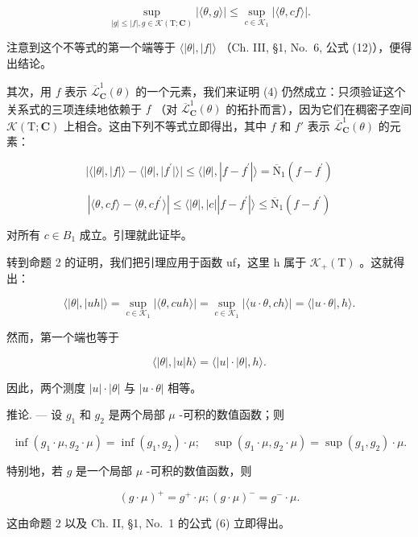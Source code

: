 \[
\sup _ {| g | \leqslant | f |, g \in \mathscr {K} (\mathrm{T}; \mathbf {C})} | \langle \theta , g \rangle | \leqslant \sup _ {c \in \mathscr {K} _ {1}} | \langle \theta , c f \rangle |.
\]

注意到这个不等式的第一个端等于 \(\langle|\theta|,|f|\rangle\) （Ch. III, §1, No.~6, 公式 (12)），便得出结论。

其次，用 \(f\) 表示 \(\overline{\mathcal{L}}_{\mathbf{C}}^{1}(\theta)\) 的一个元素，我们来证明 (4) 仍然成立：只须验证这个关系式的三项连续地依赖于 \(f\) （对 \(\overline{\mathcal{L}}_{\mathbf{C}}^{1}(\theta)\) 的拓扑而言），因为它们在稠密子空间 \(\mathcal{K}(\mathrm{T};\mathbf{C})\) 上相合。这由下列不等式立即得出，其中 \(f\) 和 \(f'\) 表示 \(\overline{\mathcal{L}}_{\mathbf{C}}^{1}(\theta)\) 的元素：

\[
| \langle | \theta |, | f | \rangle - \langle | \theta |, | f ^ {\prime} | \rangle | \leqslant \langle | \theta |, | f - f ^ {\prime} | \rangle = \overline {{\mathrm{N}}} _ {1} (f - f ^ {\prime})
\]

\[
| \langle \theta , c f \rangle - \langle \theta , c f ^ {\prime} \rangle | \leqslant \langle | \theta |, | c | | f - f ^ {\prime} | \rangle \leqslant \overline {{{\mathrm{N}}}} _ {1} (f - f ^ {\prime})
\]

对所有 \(c \in B_{1}\) 成立。引理就此证毕。

转到命题 2 的证明，我们把引理应用于函数 uf，这里 h 属于 \(\mathcal{K}_{+}(\mathrm{T})\) 。这就得出：

\[
\langle | \theta |, | u h | \rangle = \sup _ {c \in \mathscr {K} _ {1}} | \langle \theta , c u h \rangle | = \sup _ {c \in \mathscr {K} _ {1}} | \langle u \cdot \theta , c h \rangle | = \langle | u \cdot \theta |, h \rangle .
\]

然而，第一个端也等于

\[
\langle | \theta |, | u | h \rangle = \langle | u | \cdot | \theta |, h \rangle .
\]

因此，两个测度 \(|u| \cdot |\theta|\) 与 \(|u \cdot \theta|\) 相等。

推论. --- 设 \(g_{1}\) 和 \(g_{2}\) 是两个局部 \(\mu\) -可积的数值函数；则

\[
\inf (g _ {1} \cdot \mu , g _ {2} \cdot \mu) = \inf (g _ {1}, g _ {2}) \cdot \mu ; \quad \sup (g _ {1} \cdot \mu , g _ {2} \cdot \mu) = \sup (g _ {1}, g _ {2}) \cdot \mu .
\]

特别地，若 \(g\) 是一个局部 \(\mu\) -可积的数值函数，则

\[
(g \cdot \mu) ^ {+} = g ^ {+} \cdot \mu ; (g \cdot \mu) ^ {-} = g ^ {-} \cdot \mu .
\]

这由命题 2 以及 Ch. II, §1, No.~1 的公式 (6) 立即得出。

